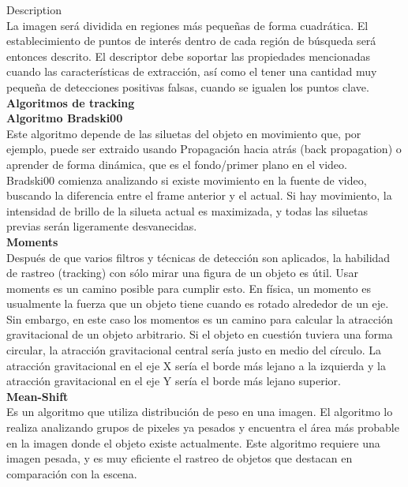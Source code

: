 Description\\
La imagen será dividida en regiones más pequeñas de forma cuadrática. El establecimiento de puntos de interés dentro de cada región de búsqueda será entonces descrito. El descriptor debe soportar las propiedades mencionadas cuando las características de extracción, así como el tener una cantidad muy pequeña de detecciones positivas falsas, cuando se igualen los puntos clave.\\

\textbf{\large{Algoritmos de tracking}}\cite{tracking}\\

\textbf{Algoritmo Bradski00}\\

Este algoritmo depende de las siluetas del objeto en movimiento que, por ejemplo, puede ser extraido usando Propagación hacia atrás (back propagation) o aprender de forma dinámica, que es el fondo/primer plano en el video. \\
Bradski00 comienza analizando si existe movimiento en la fuente de video, buscando la diferencia entre el frame anterior y el actual. Si hay movimiento, la intensidad de brillo de la silueta actual es maximizada, y todas las siluetas previas serán ligeramente desvanecidas.\\

\textbf{Moments}\\

Después de que varios filtros y técnicas de detección son aplicados, la habilidad de rastreo (tracking) con sólo mirar una figura de un objeto es útil. Usar moments es un camino posible para cumplir esto. En física, un momento es usualmente la fuerza que un objeto tiene cuando es rotado alrededor de un eje. Sin embargo, en este caso los momentos es un camino para calcular la atracción gravitacional de un objeto arbitrario. Si el objeto en cuestión tuviera una forma circular, la atracción gravitacional central sería justo en medio del círculo. La atracción gravitacional en el eje X sería el borde más lejano a la izquierda y la atracción gravitacional en el eje Y sería el borde más lejano superior.\\

\textbf{Mean-Shift}\\

Es un algoritmo que utiliza distribución de peso en una imagen. El algoritmo lo realiza analizando grupos de pixeles ya pesados y encuentra el área más probable en la imagen donde el objeto existe actualmente. Este algoritmo requiere una imagen pesada, y es muy eficiente el rastreo de objetos que destacan en comparación con la escena.\\

